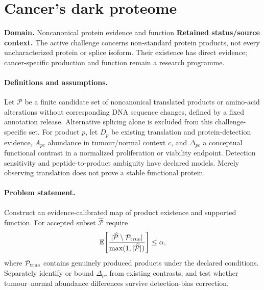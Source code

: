 \documentclass[11pt]{article}
\begin{document}
\section*{Cancer's dark proteome}
\label{prob:242}
\label{rank:180}
\par\smallskip

\noindent\textbf{Domain.} Noncanonical protein evidence and function \quad \textbf{Retained status/source context.} The active challenge concerns non-standard protein products, not every uncharacterized protein or splice isoform. Their existence has direct evidence; cancer-specific production and function remain a research programme.
\paragraph{Definitions and assumptions.} Let $\mathcal P$ be a finite candidate set of noncanonical translated products or amino-acid alterations without corresponding DNA sequence changes, defined by a fixed annotation release. Alternative splicing alone is excluded from this challenge-specific set. For product $p$, let $D_p$ be existing translation and protein-detection evidence, $A_{pc}$ abundance in tumour/normal context $c$, and $\Delta_{pc}$ a conceptual functional contrast in a normalized proliferation or viability endpoint. Detection sensitivity and peptide-to-product ambiguity have declared models. Merely observing translation does not prove a stable functional protein.
\paragraph{Problem statement.} Construct an evidence-calibrated map of product existence and supported function. For accepted subset $\widehat{\mathcal P}$ require
    \[\mathbb{E}\!\left[\frac{|\widehat{\mathcal P}\setminus\mathcal P_{\rm true}|}
    {\max(1,|\widehat{\mathcal P}|)}\right]\leq\alpha,\]
    where $\mathcal P_{\rm true}$ contains genuinely produced products under the declared conditions. Separately identify or bound $\Delta_{pc}$ from existing contrasts, and test whether tumour--normal abundance differences survive detection-bias correction.
\end{document}
